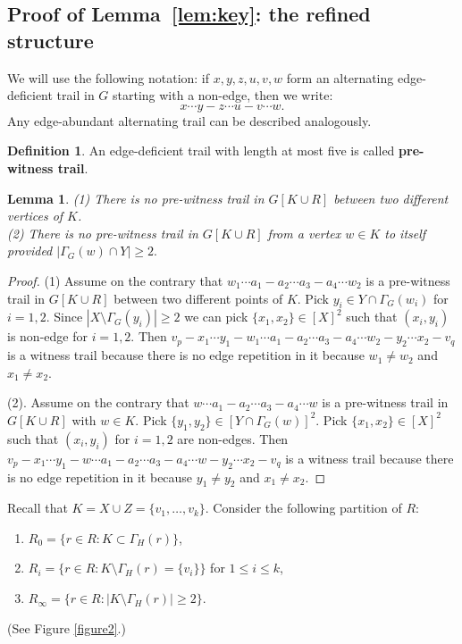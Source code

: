 \documentclass[11pt]{elsarticle}
\theoremstyle{plain}
\newtheorem{lemma}[theorem]{Lemma}
\theoremstyle{definition}
\newtheorem{definition}[theorem]{Definition}
\begin{document}
\subsection{Proof of Lemma~\ref{lem:key}: the refined structure}\label{sec:refined}

We will use the following notation: if $x,y,z,u,v,w$ form an alternating edge-deficient trail in $G$ starting with a non-edge, then we write:
\begin{displaymath}
x\cdots y - z \cdots u -v\cdots w.
\end{displaymath}
Any edge-abundant alternating trail can be described analogously.



\begin{definition}\label{df:testifier}
    An edge-deficient trail with length at most five is called \textbf{pre-witness trail}.
\end{definition}
\begin{lemma}\label{lm:sou1-2}
(1)    There is no pre-witness trail in $G[K\cup R]$ between two different vertices of $K$. \\
\noindent (2) There is no pre-witness trail in $G[K\cup R]$ from a vertex
$w\in K$ to itself provided $|\Gamma_G(w)\cap Y|\ge 2.$
\end{lemma}


\begin{proof}
(1) Assume on the contrary that  $w_1\cdots a_1-a_2\cdots a_3-a_4 \cdots w_2$ is a pre-witness trail in $G[K\cup R]$ between two different points of $K$. Pick $y_i\in {Y\cap \Gamma_G(w_i)}$ for $i=1,2$. Since $|X\setminus \Gamma_G(y_i)|\ge 2$ we can pick $\{x_1,x_2\}\in {[X]}^{2}$ such that $(x_i,y_i)$  is non-edge for $i=1,2$. Then $v_p-x_1\cdots y_1-w_1\cdots a_1-a_2\cdots a_3-a_4 \cdots w_2-y_2\cdots x_2-v_q$ is a witness trail because there is no edge repetition in it because         $w_1\ne w_2$ and $x_1\ne x_2$.

\noindent (2). Assume on the contrary that  $w\cdots a_1-a_2\cdots a_3-a_4 \cdots w$ is a pre-witness trail in $G[K\cup R]$ with $w\in K$. Pick $\{y_1,y_2\}\in {[Y\cap \Gamma_G(w)]}^{2}$. Pick $\{x_1,x_2\}\in {[X]}^{2}$ such that $(x_i,y_i)$ for $i=1,2$ are non-edges. Then $v_p-x_1\cdots y_1-w\cdots a_1-a_2\cdots a_3-a_4 \cdots w-y_2\cdots x_2-v_q$ is a  witness trail because there is no edge repetition in it because $y_1\ne y_2$ and $x_1\ne x_2$.
\end{proof}

\medskip\noindent Recall that $K=X\cup Z=\{v_1,\dots, v_k\}$. Consider the following partition of $R$:
\begin{enumerate}[(r1)]
\item $R_0=\{r\in R: K\subset  \Gamma_H(r)\}$,
\item $R_i=\{r\in R: K\setminus\Gamma_H(r)=\{v_i\}\}$ for $1\le i\le k$,
\item $R_\infty=\{r\in R: |K\setminus \Gamma_H(r)|\ge 2\}$.
\end{enumerate}
(See Figure \ref{figure2}.)
\end{document}
